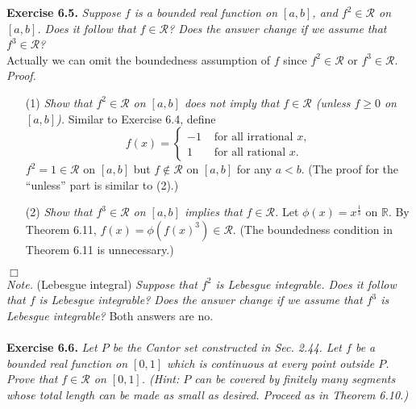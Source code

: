 \documentclass{article}
\begin{document}



\textbf{Exercise 6.5.}
\emph{Suppose $f$ is a bounded real function on $[a,b]$,
and $f^2 \in \mathscr{R}$ on $[a,b]$.
Does it follow that $f \in \mathscr{R}$?
Does the answer change if we assume that $f^3 \in \mathscr{R}$?} \\

Actually we can omit the boundedness assumption of $f$
since $f^2 \in \mathscr{R}$ or $f^3 \in \mathscr{R}$. \\

\emph{Proof.}
\begin{enumerate}
\item[(1)]
\emph{Show that $f^2 \in \mathscr{R}$ on $[a,b]$ does not imply that
$f \in \mathscr{R}$ (unless $f \geq 0$ on $[a,b]$).}
Similar to Exercise 6.4,
define
\begin{equation*}
  f(x) =
    \begin{cases}
      -1 & \text{ for all irrational $x$}, \\
      1 & \text{ for all rational $x$}.
    \end{cases}
\end{equation*}
$f^2 = 1 \in \mathscr{R}$ on $[a,b]$ but
$f \not\in \mathscr{R}$ on $[a,b]$ for any $a < b$.
(The proof for the ``unless'' part is similar to (2).)

\item[(2)]
\emph{Show that $f^3 \in \mathscr{R}$ on $[a,b]$ implies that
$f \in \mathscr{R}$.}
Let $\phi(x) = x^{\frac{1}{3}}$ on $\mathbb{R}$.
By Theorem 6.11, $f(x) = \phi(f(x)^3) \in \mathscr{R}$.
(The boundedness condition in Theorem 6.11 is unnecessary.)
\end{enumerate}
$\Box$ \\



\emph{Note.}
(Lebesgue integral)
\emph{Suppose that $f^2$ is Lebesgue integrable.
Does it follow that $f$ is Lebesgue integrable?
Does the answer change if we assume that $f^3$ is Lebesgue integrable?}
Both answers are no. \\\\






\textbf{Exercise 6.6.}
\emph{Let $P$ be the Cantor set constructed in Sec. 2.44.
Let $f$ be a bounded real function on $[0,1]$ which is continuous at every point outside $P$.
Prove that $f \in \mathscr{R}$ on $[0,1]$.
(Hint: $P$ can be covered by finitely many segments
whose total length can be made as small as desired. Proceed as in Theorem 6.10.)} \\
\end{document}
